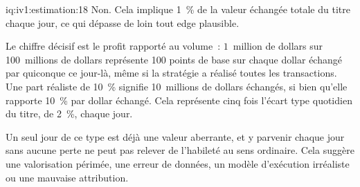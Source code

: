 \begin{solution}{iq:iv1:estimation:18}
Non. Cela implique 1~\% de la valeur échangée totale du titre chaque jour, ce qui dépasse de loin tout edge plausible.

Le chiffre décisif est le profit rapporté au volume~: $1$~million de dollars sur 100~millions de dollars représente 100 points de base sur chaque dollar échangé par quiconque ce jour-là, même si la stratégie a réalisé toutes les transactions. Une part réaliste de 10~\% signifie 10~millions de dollars échangés, si bien qu'elle rapporte 10~\% par dollar échangé. Cela représente cinq fois l'écart type quotidien du titre, de 2~\%, chaque jour.

Un seul jour de ce type est déjà une valeur aberrante, et y parvenir chaque jour sans aucune perte ne peut pas relever de l'habileté au sens ordinaire. Cela suggère une valorisation périmée, une erreur de données, un modèle d'exécution irréaliste ou une mauvaise attribution.

\end{solution}

